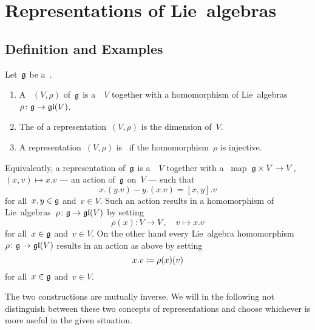 \section{Representations of Lie~algebras}





\subsection{Definition and Examples}


\begin{definition}
  Let~$\mathfrak{g}$ be a~{\liealgebra{$\kf$}}.
  \begin{enumerate}
    \item
      A ~$(V, \rho)$ of~$\mathfrak{g}$ is a~{\vectorspace{$\kf$}}~$V$ together with a homomorphism of Lie~algebras~$\rho \colon \mathfrak{g} \to \mathfrak{gl}(V)$.
    \item
      The  of a representation~$(V, \rho)$ is the dimension of~$V$.
    \item
      A representation~$(V, \rho)$ is~ if the homomorphism~$\rho$ is injective.
  \end{enumerate}
\end{definition}


\begin{remark}
  Equivalently, a representation of~$\mathfrak{g}$ is a~{\vectorspace{$\kf$}}~$V$ together with a~{\bilinear{$\kf$}} map~$\mathfrak{g} \times V \to V$,~$(x,v) \mapsto x.v$ --- an action of~$\mathfrak{g}$ on~$V$ --- such that
  \begin{equation}
  \label{representation via action}
    x.(y.v) - y.(x.v)
    =
    [x,y].v
  \end{equation}
  for all~$x, y \in \mathfrak{g}$ and~$v \in V$.
  Such an action results in a homomorphism of Lie~algebras~$\rho \colon \mathfrak{g} \to \mathfrak{gl}(V)$ by setting
  \[
    \rho(x)
    \colon
    V
    \to
    V \,,
    \quad
    v
    \mapsto
    x.v
  \]
  for all~$x \in \mathfrak{g}$ and~$v \in V$.
  On the other hand every Lie~algebra homomorphism~$\rho \colon \mathfrak{g} \to \mathfrak{gl}(V)$ results in an action as above by setting
  \[
    x.v
    \coloneqq
    \rho(x)(v)
  \]
  for all~$x \in \mathfrak{g}$ and~$v \in V$.
  
  The two constructions are mutually inverse.
  We will in the following not distinguish between these two concepts of representations and choose whichever is more useful in the given situation.
\end{remark}


